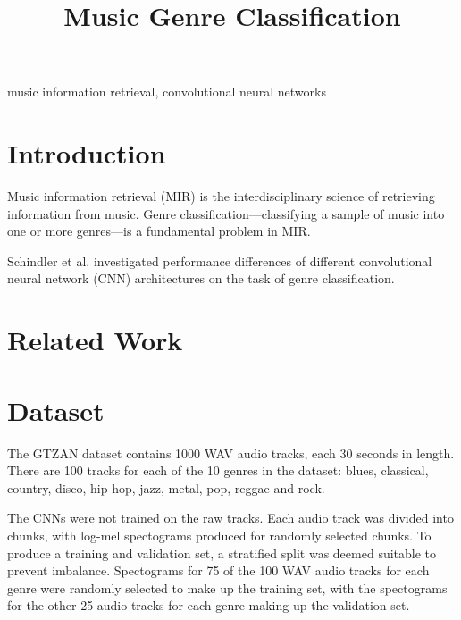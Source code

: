 \documentclass[conference]{IEEEtran}
\begin{document}
\title{Music Genre Classification}

\author{
}

\maketitle

\begin{abstract}
\end{abstract}

\begin{IEEEkeywords}
music information retrieval, convolutional neural networks
\end{IEEEkeywords}

\section{Introduction}

Music information retrieval (MIR) is the interdisciplinary science of retrieving information from music.
Genre classification---classifying a sample of music into one or more genres---is a fundamental problem in MIR.

Schindler et al. \cite{SchindlerLidyRauber} investigated performance differences of different convolutional neural network (CNN) architectures on the task of genre classification.


\section{Related Work}

\section{Dataset}

The GTZAN dataset \cite{TzanetakisEsslCook} contains 1000 WAV audio tracks, each 30 seconds in length.
There are 100 tracks for each of the 10 genres in the dataset: blues, classical, country, disco, hip-hop, jazz, metal, pop, reggae and rock.

The CNNs were not trained on the raw tracks.
Each audio track was divided into chunks, with log-mel spectograms produced for randomly selected chunks.
To produce a training and validation set, a stratified split was deemed suitable to prevent imbalance.
Spectograms for 75 of the 100 WAV audio tracks for each genre were randomly selected to make up the training set, with the spectograms for the other 25 audio tracks for each genre making up the validation set.
\end{document}
